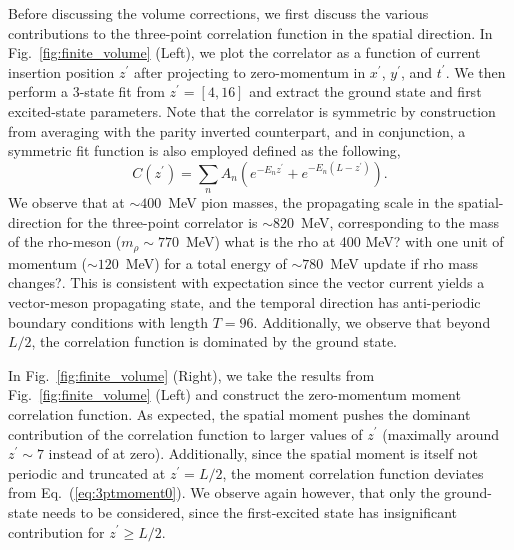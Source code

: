 \documentclass[prd,aps,twocolumn,superscriptaddress,tightenlines,nofootinbib,floatfix,preprintnumbers,10pt]{revtex4-1}
\begin{document}
Before discussing the volume corrections, we first discuss the various contributions to the three-point correlation function in the spatial direction. In Fig.~\ref{fig:finite_volume} (Left), we plot the correlator as a function of current insertion position $z^\prime$ after projecting to zero-momentum in $x^\prime$, $y^\prime$, and $t^\prime$. We then perform a 3-state fit from $z^\prime = [4,16]$ and extract the ground state and first excited-state parameters. Note that the correlator is symmetric by construction from averaging with the parity inverted counterpart, and in conjunction, a symmetric fit function is also employed defined as the following,
\begin{equation}
C(z^\prime) = \sum_n A_n\left(e^{-E_n z^\prime} + e^{-E_n(L-z^\prime)}\right).\label{eq:3ptz}
\end{equation} We observe that at $\sim 400$~MeV pion masses, the propagating scale in the spatial-direction for the three-point correlator is $\sim 820$~MeV, corresponding to the mass of the rho-meson ($m_\rho \sim 770$~MeV) {\color{red} what is the rho at 400 MeV?} with one unit of momentum ($\sim 120$~MeV) for a total energy of $\sim780$~MeV {\color{red} update if rho mass changes?}. This is consistent with expectation since the vector current yields a vector-meson propagating state, and the temporal direction has anti-periodic boundary conditions with length $T=96$. Additionally, we observe that beyond $L/2$, the correlation function is dominated by the ground state.

In Fig.~\ref{fig:finite_volume} (Right), we take the results from Fig.~\ref{fig:finite_volume} (Left) and construct the zero-momentum moment correlation function. As expected, the spatial moment pushes the dominant contribution of the correlation function to larger values of $z^\prime$ (maximally around $z^\prime \sim 7$ instead of at zero). Additionally, since the spatial moment is itself not periodic and truncated at $z^\prime = L/2$, the moment correlation function deviates from Eq.~(\ref{eq:3ptmoment0}). We observe again however, that only the ground-state needs to be considered, since the first-excited state has insignificant contribution for $z^\prime \geq L/2$.
\end{document}
